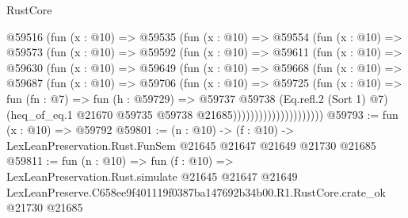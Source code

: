 \begin{lexlean}{RustCore}
\begin{coremodule}
                  @59516
                    (fun (x : @10) =>
                    @59535
                      (fun (x : @10) =>
                      @59554
                        (fun (x : @10) =>
                        @59573
                          (fun (x : @10) =>
                          @59592
                            (fun (x : @10) =>
                            @59611
                              (fun (x : @10) =>
                              @59630
                                (fun (x : @10) =>
                                @59649
                                  (fun (x : @10) =>
                                  @59668
                                    (fun (x : @10) =>
                                    @59687
                                      (fun (x : @10) =>
                                      @59706
                                        (fun (x : @10) =>
                                        @59725
                                          (fun (x : @10) =>
                                          fun (fn : @7) =>
                                          fun (h : @59729) =>
                                          @59737
                                            @59738
                                            (Eq.refl.{2} (Sort 1) @7)
                                            (heq_of_eq.{1}
                                              @21670
                                              @59735
                                              @59738
                                              @21685)))))))))))))))))))))
@59793 := fun (x : @10) => @59792
@59801 := (n : @10) ->
  (f : @10) -> LexLeanPreservation.Rust.FunSem @21645 @21647 @21649 @21730 @21685
@59811 := fun (n : @10) =>
  fun (f : @10) =>
  LexLeanPreservation.Rust.simulate
    @21645
    @21647
    @21649
    LexLeanPreserve.C658ee9f401119f0387ba147692b34b00.R1.RustCore.crate_ok
    @21730
    @21685
\end{coremodule}
\end{lexlean}
